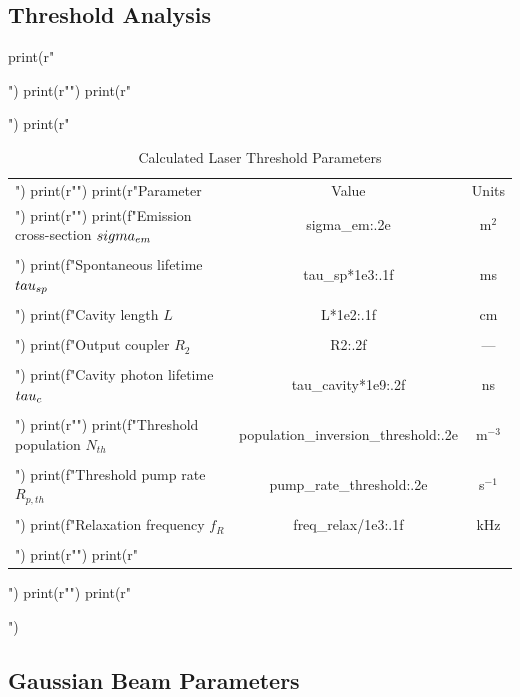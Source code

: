 \documentclass[a4paper, 11pt]{article}
\begin{document}
\subsection{Threshold Analysis}

\begin{pycode}
print(r"\begin{table}[htbp]")
print(r"\centering")
print(r"\caption{Calculated Laser Threshold Parameters}")
print(r"\begin{tabular}{lcc}")
print(r"\toprule")
print(r"Parameter & Value & Units \\")
print(r"\midrule")
print(f"Emission cross-section $\\sigma_{{em}}$ & {sigma_em:.2e} & m$^2$ \\\\")
print(f"Spontaneous lifetime $\\tau_{{sp}}$ & {tau_sp*1e3:.1f} & ms \\\\")
print(f"Cavity length $L$ & {L*1e2:.1f} & cm \\\\")
print(f"Output coupler $R_2$ & {R2:.2f} & --- \\\\")
print(f"Cavity photon lifetime $\\tau_c$ & {tau_cavity*1e9:.2f} & ns \\\\")
print(r"\midrule")
print(f"Threshold population $N_{{th}}$ & {population_inversion_threshold:.2e} & m$^{{-3}}$ \\\\")
print(f"Threshold pump rate $R_{{p,th}}$ & {pump_rate_threshold:.2e} & s$^{{-1}}$ \\\\")
print(f"Relaxation frequency $f_R$ & {freq_relax/1e3:.1f} & kHz \\\\")
print(r"\bottomrule")
print(r"\end{tabular}")
print(r"\label{tab:threshold}")
print(r"\end{table}")
\end{pycode}

\subsection{Gaussian Beam Parameters}
\end{document}
